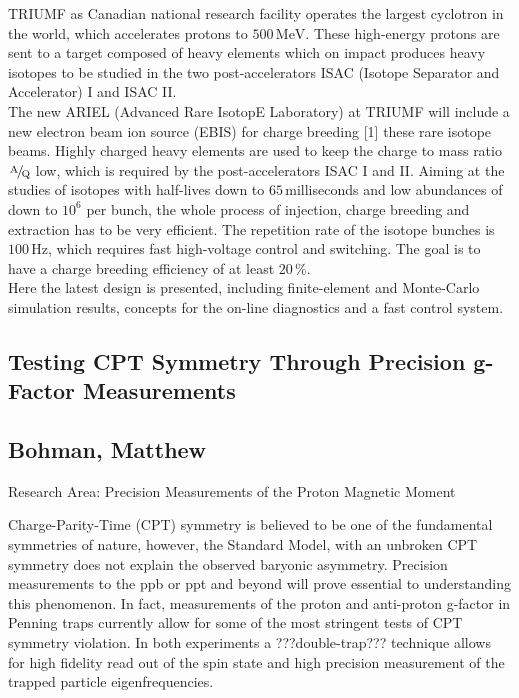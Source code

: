 \noindent TRIUMF as Canadian national research facility operates the largest cyclotron in the world, which accelerates protons to $500\,\textrm{MeV}$. These high-energy protons are sent to a target composed of heavy elements which on impact produces heavy isotopes to be studied in the two post-accelerators ISAC (Isotope Separator and Accelerator) I and ISAC II.\\The new ARIEL (Advanced Rare IsotopE Laboratory) at TRIUMF will include a new electron beam ion source (EBIS) for charge breeding [1] these rare isotope beams. Highly charged heavy elements are used to keep the charge to mass ratio $\kern.1em\raise.5ex\hbox{\the\scriptfont0 A}\kern-.1em/\kern-.15em\lower.25ex\hbox{\the\scriptfont0 Q}$ low, which is required by the post-accelerators ISAC I and II. Aiming at the studies of isotopes with half-lives down to $65$\,milli\-seconds and low abundances of down to $10^6$ per bunch, the whole process of injection, charge breeding and extraction has to be very efficient. The repetition rate of the isotope bunches is $100\,\textrm{Hz}$, which requires fast high-voltage control and switching. The goal is to have a charge breeding efficiency of at least $20\,\%$.\\Here the latest design is presented, including finite-element and Monte-Carlo simulation results, concepts for the on-line diagnostics and a fast control system.
\newpage
\subsection*{\centering \large Testing CPT Symmetry Through Precision g-Factor Measurements}
\subsection*{\centering \normalsize Bohman, Matthew}
Research Area: Precision Measurements of the Proton Magnetic Moment\newline

\noindent Charge-Parity-Time (CPT) symmetry is believed to be one of the fundamental symmetries of nature, however, the Standard Model, with an unbroken CPT symmetry does not explain the observed baryonic asymmetry. Precision measurements to the ppb or ppt and beyond will prove essential to understanding this phenomenon. In fact, measurements of the proton and anti-proton g-factor in Penning traps currently allow for some of the most stringent tests of CPT symmetry violation. In both experiments a ???double-trap??? technique allows for high fidelity read out of the spin state and high precision measurement of the trapped particle eigenfrequencies.
